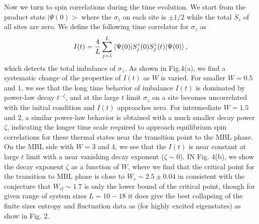 \documentclass[prl,aps,epsf,showpacs,twocolumn,letterpaper]{revtex4}
\begin{document}
Now we turn to  spin correlations during the time evolution.  We start from the product state $|\Psi(0)>$ where the $\sigma_z$ on each site is $\pm 1/2$ while the total $S_z$ of all sites are zero.  We define the following time correlator for $\sigma_z$ as 
\begin{equation}
I(t)=\frac{4}{L} \sum_{j=1}^L \braket{\Psi(0)|S_j^z(0)S_j^z(t)|\Psi(0)} \text{,} \label{eq:imb}
\end{equation}
which detects the total imbalance of $\sigma_z$.  As shown in Fig.4(a), we find a systematic change of the properties of $I(t)$ as $W$ is varied.  For smaller $W=0.5$ and $1$, we see that the long time behavior of imbalance $I(t)$ is dominated by  power-law decay $t^{-\zeta}$, and at the large $t$ limit $\sigma_z$ on a site becomes uncorrelated with the initial condition and $I(t)$ approaches zero.  For intermediate $W=1.5$ and $2$, a similar power-law behavior is obtained with a much smaller decay power $\zeta$, indicating the longer time scale required to approach equilibrium spin correlations for these thermal states near the transition point to the MBL phase.  On the MBL side with $W=3$ and $4$, we see that the $I(t)$ is near constant at large $t$ limit with a near vanishing decay exponent ($\zeta \sim 0$).
IN Fig. 4(b),  we show the decay exponent $\zeta$ as a function of $W$,  where we find that the critical point for the transition to MBL phase is close to $W_c \sim 2.5\pm 0.04$ in consistent
with the conjecture that $W_{cl}\sim 1.7$ is only the lower bound of the critical point, though for given range of system sizes $L=10-18$
 it does give the best collapsing of the finite sizes entropy and fluctuation data as (for highly excited eigenstates) as show in Fig. 2.
\end{document}
